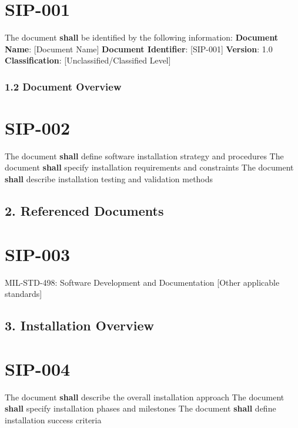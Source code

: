 \section{SIP-001}\label{SIP-001}

The document \textbf{shall} be identified by the following information:
\textbf{Document Name}: [Document Name]
\textbf{Document Identifier}: [SIP-001]
\textbf{Version}: 1.0
\textbf{Classification}: [Unclassified/Classified Level]

\subsubsection{1.2 Document Overview}

\section{SIP-002}\label{SIP-002}

The document \textbf{shall} define software installation strategy and procedures
The document \textbf{shall} specify installation requirements and constraints
The document \textbf{shall} describe installation testing and validation methods

\subsection{2. Referenced Documents}

\section{SIP-003}\label{SIP-003}

MIL-STD-498: Software Development and Documentation
[Other applicable standards]\\

\subsection{3. Installation Overview}

\section{SIP-004}\label{SIP-004}

The document \textbf{shall} describe the overall installation approach
The document \textbf{shall} specify installation phases and milestones
The document \textbf{shall} define installation success criteria

